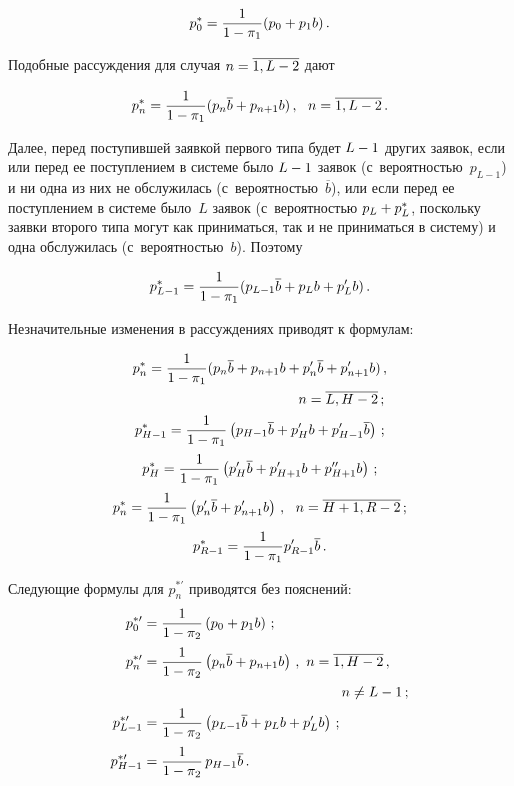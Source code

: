 \begin{multicols}{2}
\noindent
$$
p^*_0=\displaystyle\frac{\displaystyle 1\mathstrut}{\displaystyle 1 - \pi_1\mathstrut}(p_{0} + p_1 b)\,.
$$

Подобные рассуждения для
случая $n\hm=\overline{1,L-2}$ дают

\noindent
$$
p^*_n=\fr{1}{1 - \pi_1}
(p_{n} \overline{b} + p_{n+1} b)\,,\ \ n=\overline{1,L-2}\,.
$$

Далее, перед поступившей заявкой первого типа
будет $L\hm-1$ других заявок,
если или перед ее поступлением в системе было $L\hm-1$
заявок (с~вероятностью~$p_{L-1}$) и ни одна из них
не обслужилась (с~вероятностью~$\overline{b}$),
или если перед ее поступлением в системе было~$L$
заявок (с~вероятностью $p_{L}\hm+p^*_L$, поскольку
заявки второго типа могут как приниматься, так и не
приниматься в систему)
и одна обслужилась (с~вероятностью~$b$).
Поэтому

\noindent
$$
p^*_{L-1}=\displaystyle\frac{\displaystyle 1\mathstrut}{\displaystyle 1 - \pi_1\mathstrut}
(p_{L-1} \overline{b} + p_{L} b + p'_{L} b)\,.
$$

Незначительные изменения в рассуждениях приводят к формулам:

\noindent
\begin{gather*}
p^*_n=\fr{1}{1 - \pi_1}
(p_{n} \overline{b} + p_{n+1} b
+ p'_{n} \overline{b} + p'_{n+1} b)\,,\\
\hspace*{41mm}n=\overline{L,H-2}\,;
\\
p^*_{H-1} = \fr{1}{1 - \pi_1}
\left(p_{H-1} \overline{b} + p'_{H} b + p'_{H-1} \overline{b}\right)\,;
\\
p^*_{H}=\fr{1}{1 - \pi_1}
\left(p'_{H} \overline{b} + p'_{H+1} b+p''_{H+1} b\right)\,;
\\
p^*_n=\fr{1}{1 - \pi_1}\left(p'_{n} \overline{b} + p'_{n+1} b\right)\,,\ \
n=\overline{H+1,R-2}\,;
\\
p^*_{R-1}=\fr{1}{1 - \pi_1} p'_{R-1} \overline{b}\,.
\end{gather*}

Следующие формулы для $p^{*\prime}_n$ приводятся без пояснений:
\begin{align*}
p^{*\prime}_0 &= \fr{1}{1 - \pi_2}
\left(p_{0} + p_1 b\right)\,;
\\
p^{*\prime}_n &= \fr{1}{1 - \pi_2}
\left(p_{n} \overline{b} + p_{n+1} b\right)\,,
 \ n=\overline{1,H-2}\,,\\
 &\hspace*{50mm}n\ne L-1\,;
\\
p^{*\prime}_{L-1}&=\fr{1}{1 - \pi_2}
\left(p_{L-1} \overline{b} + p_{L} b + p'_{L} b\right)\,;
\\
p^{*\prime}_{H-1}&=\fr{1}{1 - \pi_2}\,
p_{H-1} \overline{b} \,.
\end{align*}


\end{multicols}
